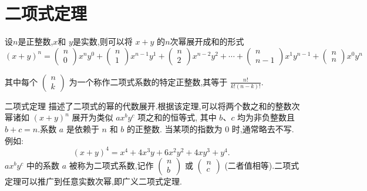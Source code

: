 \documentclass[main]{subfiles}
\begin{document}
\renewcommand{\filename}{subfile15}%

\section{二项式定理}
\begin{theorem}
    设$n$是正整数,$x$和 $y$是实数,则可以将 $x+y$ 的$n$次幂展开成和的形式
    $$
    (x+y)^n=\left(\begin{array}{l}n \\
    0
    \end{array}\right) x^n y^0+\left(\begin{array}{c}
    n \\
    1
    \end{array}\right) x^{n-1} y^1+\left(\begin{array}{c}
    n \\
    2
    \end{array}\right) x^{n-2} y^2+\cdots+\left(\begin{array}{c}
    n \\
    n-1
    \end{array}\right) x^1 y^{n-1}+\left(\begin{array}{l}
    n \\
    n
    \end{array}\right) x^0 y^n
    $$
    
    其中每个 $\left(\begin{array}{c}n \\k \end{array}\right)$
    为一个称作二项式系数的特定正整数,其等于 $\frac{n !}{k !(n-k) !}$.
\end{theorem}
二项式定理 %
描述了二项式的幂的代数展开.根据该定理,可以将两个数之和的整数次幂诸如 $(x+y)^n$ 
展开为类似 $a x^b y^c$ 项之和的恒等式,
其中 $b$、$c$ 均为非负整数且 $b+c=n$.系数 $a$ 是依赖于 $n$ 和 $b$ 的正整数.
当某项的指数为 0 时,通常略去不写.例如: 
$$
(x+y)^4=x^4+4 x^3 y+6 x^2 y^2+4 x y^3+y^4 \text {. }
$$
$a x^b y^c$ 中的系数 $a$ 被称为二项式系数,记作 
$\left(\begin{array}{l}n \\ b\end{array}\right)$ 
或 $\left(\begin{array}{l}n \\ c\end{array}\right)$ 
(二者值相等).二项式定理可以推广到任意实数次幂,即广义二项式定理.
\end{document}
